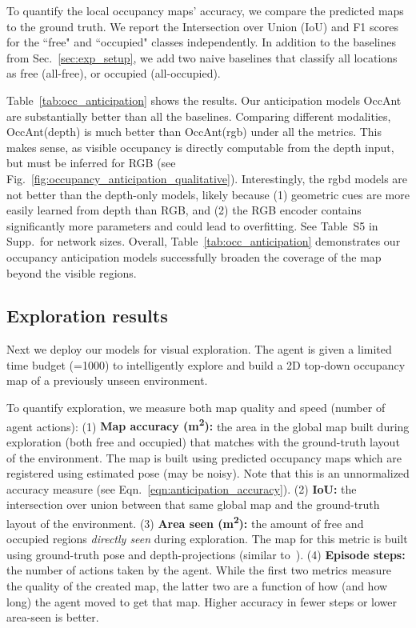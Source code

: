 \documentclass[runningheads]{llncs}
\begin{document}
To quantify the local occupancy maps' accuracy, we compare the predicted maps to the ground truth. We report the Intersection over Union (IoU) and F1 scores for the ``free" and ``occupied" classes independently. In addition to the baselines from Sec.~\ref{sec:exp_setup}, we add two naive baselines that classify all locations as free (all-free), or occupied (all-occupied). 

Table~\ref{tab:occ_anticipation} shows the results.  Our anticipation models OccAnt are substantially better than all the baselines.  Comparing different modalities, OccAnt(depth) is much better than OccAnt(rgb) under all the metrics. This makes sense, as visible occupancy is directly computable from the depth input, but must be inferred for RGB (see Fig.~\ref{fig:occupancy_anticipation_qualitative}). Interestingly, the rgbd models are not better than the depth-only models, likely because (1) geometric cues are more easily learned from depth than RGB, and (2) the RGB encoder contains significantly more parameters and could lead to overfitting.  See Table~S5 in Supp.~for network sizes. Overall, Table~\ref{tab:occ_anticipation} demonstrates our occupancy anticipation models successfully broaden the coverage of the map beyond the visible regions. 



\subsection{Exploration results}\label{sec:exp_exploration}

Next we deploy our models for visual exploration. The agent is given a limited time budget (=1000) to intelligently explore and build a 2D top-down occupancy map of a previously unseen environment. 

To quantify exploration, we measure both map quality and speed (number of agent actions):
(1) \textbf{Map accuracy (\si{m^2}):} the area in the global map built during exploration (both free and occupied) that matches with the ground-truth layout of the environment. The map is built using predicted occupancy maps which are registered using estimated pose (may be noisy). Note that this is an unnormalized accuracy measure (see Eqn.~\ref{eqn:anticipation_accuracy}). (2) \textbf{IoU:} the intersection over union between that same global map and the ground-truth layout of the environment. (3) \textbf{Area seen (\si{m^2}):} the amount of free and occupied regions \emph{directly seen} during exploration. The map for this metric is built using ground-truth pose and depth-projections (similar to~\cite{chen2019learning,chaplot2020learning}). (4) \textbf{Episode steps:} the number of actions taken by the agent. While the first two metrics measure the quality of the created map, the latter two are a function of how (and how long) the agent moved to get that map. Higher accuracy in fewer steps or lower area-seen is better.\\
\end{document}

